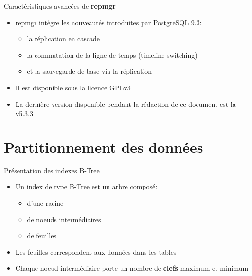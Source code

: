 
\begin{frame}[fragile]{Caractéristiques avancées de \textbf{repmgr}}

   \begin{itemize}
      \item repmgr intègre les nouveautés introduites par PostgreSQL 9.3:
         \begin{itemize}
            \item la réplication en cascade
            \item la commutation de la ligne de temps (timeline switching)
            \item et la sauvegarde de base via la réplication
         \end{itemize}
      \item Il est disponible sous la licence GPLv3
      \item La dernière version disponible pendant la rédaction de ce document est la v5.3.3
   \end{itemize}

\end{frame}


\section{Partitionnement des données}


\begin{frame}[fragile]{Présentation des indexes B-Tree}

   \begin{itemize}
      \item Un index de type B-Tree est un arbre composé:
      \begin{itemize}
         \item d'une racine
         \item de noeuds intermédiaires
         \item de feuilles
      \end{itemize}
      \item Les feuilles correspondent aux données dans les tables
      \item Chaque noeud intermédiaire porte un nombre de \textbf{clefs} maximum et minimum

   \end{itemize}

\begin{toile}
\end{toile}

\end{frame}

